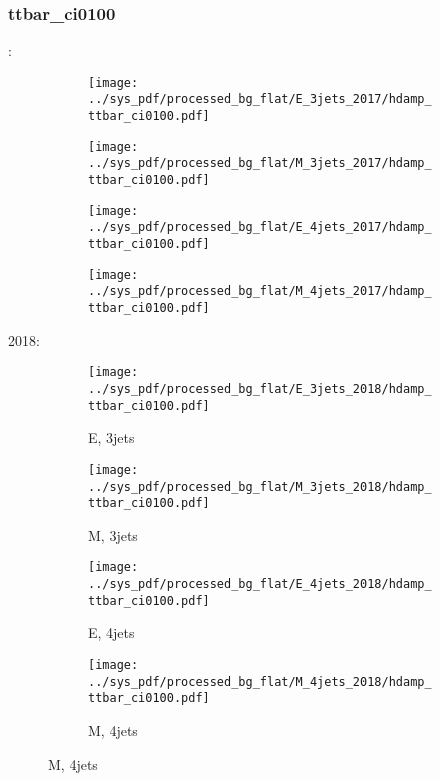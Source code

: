 \documentclass{beamer}
\begin{document}
\begin{frame}
\frametitle{ttbar_ci0100}
\fontsize{5}{1}:
\begin{figure}
\centering
\begin{subfigure}[b]{0.24\textwidth}
\texttt{[image: ../sys\_pdf/processed\_bg\_flat/E\_3jets\_2017/hdamp\_ttbar\_ci0100.pdf]}
\end{subfigure}
\begin{subfigure}[b]{0.24\textwidth}
\texttt{[image: ../sys\_pdf/processed\_bg\_flat/M\_3jets\_2017/hdamp\_ttbar\_ci0100.pdf]}
\end{subfigure}
\begin{subfigure}[b]{0.24\textwidth}
\texttt{[image: ../sys\_pdf/processed\_bg\_flat/E\_4jets\_2017/hdamp\_ttbar\_ci0100.pdf]}
\end{subfigure}
\begin{subfigure}[b]{0.24\textwidth}
\texttt{[image: ../sys\_pdf/processed\_bg\_flat/M\_4jets\_2017/hdamp\_ttbar\_ci0100.pdf]}
\end{subfigure}
\end{figure}
2018:
\begin{figure}
\centering
\begin{subfigure}[b]{0.24\textwidth}
\texttt{[image: ../sys\_pdf/processed\_bg\_flat/E\_3jets\_2018/hdamp\_ttbar\_ci0100.pdf]}
\captionsetup{font=tiny}
\caption{E, 3jets}
\end{subfigure}
\begin{subfigure}[b]{0.24\textwidth}
\texttt{[image: ../sys\_pdf/processed\_bg\_flat/M\_3jets\_2018/hdamp\_ttbar\_ci0100.pdf]}
\captionsetup{font=tiny}
\caption{M, 3jets}
\end{subfigure}
\begin{subfigure}[b]{0.24\textwidth}
\texttt{[image: ../sys\_pdf/processed\_bg\_flat/E\_4jets\_2018/hdamp\_ttbar\_ci0100.pdf]}
\captionsetup{font=tiny}
\caption{E, 4jets}
\end{subfigure}
\begin{subfigure}[b]{0.24\textwidth}
\texttt{[image: ../sys\_pdf/processed\_bg\_flat/M\_4jets\_2018/hdamp\_ttbar\_ci0100.pdf]}
\captionsetup{font=tiny}
\caption{M, 4jets}
\end{subfigure}
\end{figure}
\end{frame}
\end{document}
